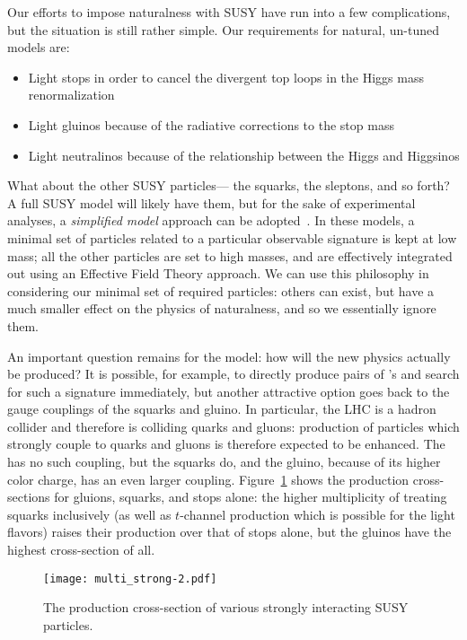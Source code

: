 Our efforts to impose naturalness with SUSY have run into a few complications, but the situation is still rather simple. Our requirements for natural, un-tuned models are:
%
\begin{itemize}
\item Light stops in order to cancel the divergent top loops in the Higgs mass renormalization
\item Light gluinos because of the radiative corrections to the stop mass
\item Light neutralinos because of the relationship between the Higgs and Higgsinos
\end{itemize}
%
What about the other SUSY particles--- the squarks, the sleptons, and so forth? A full SUSY model will likely have them, but for the sake of experimental analyses, a \textit{simplified model} approach can be adopted~\cite{simplified}. In these models, a minimal set of particles related to a particular observable signature is kept at low mass; all the other particles are set to high masses, and are effectively integrated out using an Effective Field Theory approach. We can use this philosophy in considering our minimal set of required particles: others can exist, but have a much smaller effect on the physics of naturalness, and so we essentially ignore them.


An important question remains for the model: how will the new physics actually be produced? It is possible, for example, to directly produce pairs of \lsp's and search for such a signature immediately, but another attractive option goes back to the gauge couplings of the squarks and gluino. In particular, the LHC is a hadron collider and therefore is colliding quarks and gluons: production of particles which strongly couple to quarks and gluons is therefore expected to be enhanced. The \lsp has no such coupling, but the squarks do, and the gluino, because of its higher color charge, has an even larger coupling. Figure~\ref{fig:susy:multi_strong} shows the production cross-sections for gluions, squarks, and stops alone: the higher multiplicity of treating squarks inclusively (as well as $t$-channel production which is possible for the light flavors) raises their production over that of stops alone, but the gluinos have the highest cross-section of all. 


\begin{figure}
\centering
\texttt{[image: multi\_strong-2.pdf]}
\label{fig:susy:multi_strong}
\caption{The production cross-section of various strongly interacting SUSY particles. }
\end{figure}

